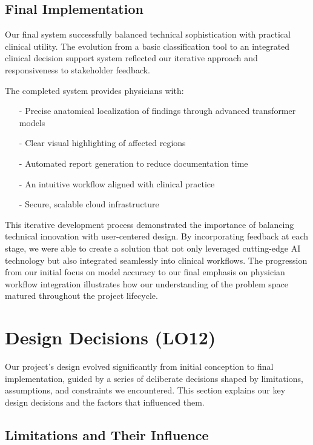 \documentclass{article}
\begin{document}
\subsection{Final Implementation}

Our final system successfully balanced technical sophistication with practical clinical utility. The evolution from a basic classification tool to an integrated clinical decision support system reflected our iterative approach and responsiveness to stakeholder feedback. 

\noindent The completed system provides physicians with:
\begin{itemize}
    \item[-] Precise anatomical localization of findings through advanced transformer models
    \item[-] Clear visual highlighting of affected regions 
    \item[-] Automated report generation to reduce documentation time
    \item[-] An intuitive workflow aligned with clinical practice
    \item[-] Secure, scalable cloud infrastructure
\end{itemize}

\noindent This iterative development process demonstrated the importance of balancing technical innovation with user-centered design. By incorporating feedback at each stage, we were able to create a solution that not only leveraged cutting-edge AI technology but also integrated seamlessly into clinical workflows. The progression from our initial focus on model accuracy to our final emphasis on physician workflow integration illustrates how our understanding of the problem space matured throughout the project lifecycle.

\section{Design Decisions (LO12)}

Our project's design evolved significantly from initial conception to final implementation, guided by a series of deliberate decisions shaped by limitations, assumptions, and constraints we encountered. This section explains our key design decisions and the factors that influenced them.

\subsection{Limitations and Their Influence}
\end{document}
